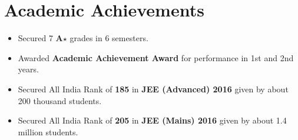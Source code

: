 \section*{Academic Achievements}
\begin{itemize}

\setlength\itemsep{0pt}
\item Secured 7 \textbf{A$\star$} grades in 6 semesters.
\item Awarded \textbf{Academic Achievement Award} for performance in 1st and 2nd years.
\item Secured All India Rank of {\bf 185} in {\bf JEE (Advanced) 2016} given by about 200 thousand students.
\item Secured All India Rank of {\bf 205} in {\bf JEE (Mains) 2016} given by about 1.4 million students.

\end{itemize}
